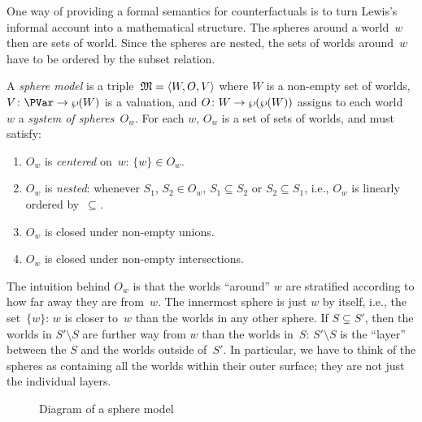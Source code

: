 \documentclass[../../../include/open-logic-section]{subfiles}
\begin{document}


One way of providing a formal semantics for counterfactuals is to turn
Lewis's informal account into a mathematical structure. The spheres
around a world~$w$ then are sets of world. Since the spheres are
nested, the sets of worlds around~$w$ have to be ordered by the subset
relation.  

\begin{defn}
  A \emph{sphere model} is a triple~$\mathfrak M = \langle W, O, V \rangle$
  where $W$ is a non-empty set of worlds, $V\colon \PVar \to \Pow{W}$
  is a valuation, and $O\colon W \to \wp(\wp(W))$ assigns to each
  world~$w$ a \emph{system of spheres}~$O_w$. For each $w$, $O_w$ is a
  set of sets of worlds, and must satisfy:
  \begin{enumerate}
  \item $O_w$ is \emph{centered} on~$w$: $\{w\} \in O_w$.
  \item $O_w$ is \emph{nested}: whenever $S_1$, $S_2 \in O_w$, $S_1
    \subseteq S_2$ or $S_2 \subseteq S_1$, i.e., $O_w$ is linearly
    ordered by~$\subseteq$.
  \item $O_w$ is closed under non-empty unions.
  \item $O_w$ is closed under non-empty intersections.
  \end{enumerate}
\end{defn}

The intuition behind $O_w$ is that the worlds ``around'' $w$ are
stratified according to how far away they are from~$w$. The innermost
sphere is just $w$ by itself, i.e., the set~$\{w\}$: $w$ is closer
to~$w$ than the worlds in any other sphere. If $S \subsetneq S'$, then
the worlds in $S' \setminus S$ are further way from $w$ than the
worlds in~$S$: $S' \setminus S$ is the ``layer'' between the $S$ and
the worlds outside of~$S'$. In particular, we have to think of the
spheres as containing all the worlds within their outer surface; they
are not just the individual layers.

\begin{figure}
\begin{center}
\caption{Diagram of a sphere model}
\end{center}
\end{figure}
\end{document}
